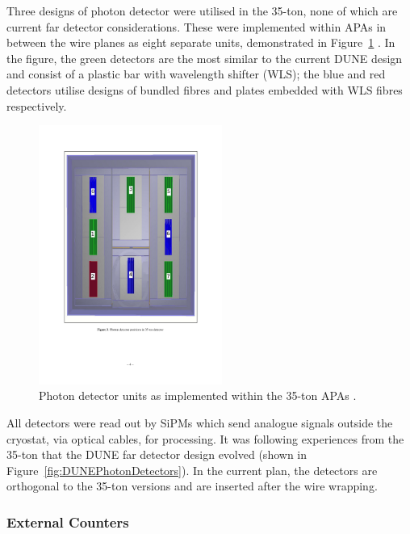 Three designs of photon detector were utilised in the 35-ton, none of which are current far detector considerations.  These were implemented within APAs in between the wire planes as eight separate units, demonstrated in Figure~\ref{fig:35tonPhotonDetectors} \cite{35tonPhotonDetectors}.  In the figure, the green detectors are the most similar to the current DUNE design and consist of a plastic bar with wavelength shifter (WLS); the blue and red detectors utilise designs of bundled fibres and plates embedded with WLS fibres respectively.

\begin{figure}
  \centering
  \includegraphics[width=6cm]{35tonPhotonDetectors.pdf}
  \caption[Photon detector units as implemented within the 35-ton APAs.]{Photon detector units as implemented within the 35-ton APAs \cite{35tonPhotonDetectors}.}
  \label{fig:35tonPhotonDetectors}
\end{figure}

All detectors were read out by SiPMs which send analogue signals outside the cryostat, via optical cables, for processing.  It was following experiences from the 35-ton that the DUNE far detector design evolved (shown in Figure~\ref{fig:DUNEPhotonDetectors}).  In the current plan, the detectors are orthogonal to the 35-ton versions and are inserted after the wire wrapping.

\subsubsection{External Counters}\label{sec:35tonExternalCounters}


